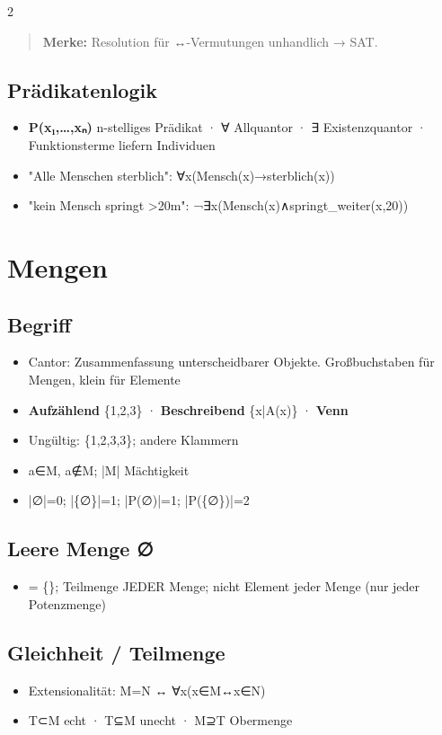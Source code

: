 \documentclass[10pt, a4paper]{article}
\begin{document}
\begin{multicols}{2}
\begin{quote}
\textbf{Merke:} Resolution für ↔-Vermutungen unhandlich → SAT.
\end{quote}


\subsection{Prädikatenlogik}
\begin{itemize}
  \item \textbf{P(x₁,…,xₙ)} n-stelliges Prädikat · ∀ Allquantor · ∃ Existenzquantor · Funktionsterme liefern Individuen
  \item "Alle Menschen sterblich": ∀x(Mensch(x)→sterblich(x))
  \item "kein Mensch springt >20m": ¬∃x(Mensch(x)∧springt\_weiter(x,20))
\end{itemize}


\section{Mengen}


\subsection{Begriff}
\begin{itemize}
  \item Cantor: Zusammenfassung unterscheidbarer Objekte. Großbuchstaben für Mengen, klein für Elemente
  \item \textbf{Aufzählend} \{1,2,3\} · \textbf{Beschreibend} \{x|A(x)\} · \textbf{Venn}
  \item Ungültig: \{1,2,3,3\}; andere Klammern
  \item a∈M, a∉M; |M| Mächtigkeit
  \item |∅|=0; |\{∅\}|=1; |P(∅)|=1; |P(\{∅\})|=2
\end{itemize}


\subsection{Leere Menge ∅}
\begin{itemize}
  \item = \{\}; Teilmenge JEDER Menge; nicht Element jeder Menge (nur jeder Potenzmenge)
\end{itemize}


\subsection{Gleichheit / Teilmenge}
\begin{itemize}
  \item Extensionalität: M=N ↔ ∀x(x∈M↔x∈N)
  \item T⊂M echt · T⊆M unecht · M⊇T Obermenge
\end{itemize}



\end{multicols}
\end{document}
